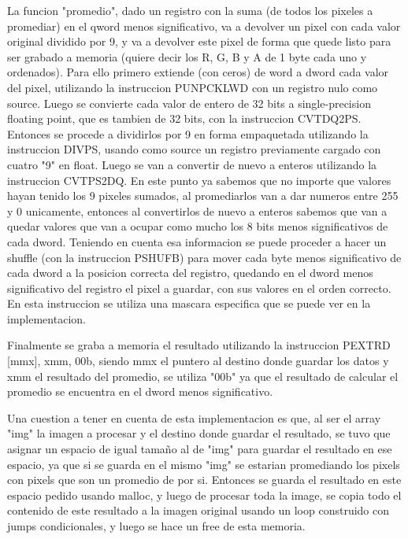 \documentclass[a4paper]{article}
\begin{document}
La funcion "promedio", dado un registro con la suma (de todos los pixeles a promediar) en el qword menos significativo, va a devolver un pixel con cada valor original dividido por 9, y va a devolver este pixel de forma que quede listo para ser grabado a memoria (quiere decir los R, G, B y A de 1 byte cada uno y ordenados). Para ello primero extiende (con ceros) de word a dword cada valor del pixel, utilizando la instruccion PUNPCKLWD con un registro nulo como source. Luego se convierte cada valor de entero de 32 bits a single-precision floating point, que es tambien de 32 bits, con la instruccion CVTDQ2PS. Entonces se procede a dividirlos por 9 en forma empaquetada utilizando la instruccion DIVPS, usando como source un registro previamente cargado con cuatro "9" en float. Luego se van a convertir de nuevo a enteros utilizando la instruccion CVTPS2DQ. En este punto ya sabemos que no importe que valores hayan tenido los 9 pixeles sumados, al promediarlos van a dar numeros entre 255 y 0 unicamente, entonces al convertirlos de nuevo a enteros sabemos que van a quedar valores que van a ocupar como mucho los 8 bits menos significativos de cada dword. Teniendo en cuenta esa informacion se puede proceder a hacer un shuffle (con la instruccion PSHUFB) para mover cada byte menos significativo de cada dword a la posicion correcta del registro, quedando en el dword menos significativo del registro el pixel a guardar, con sus valores en el orden correcto. En esta instruccion se utiliza una mascara especifica que se puede ver en la implementacion.
\newline

Finalmente se graba a memoria el resultado utilizando la instruccion PEXTRD [mmx], xmm, 00b, siendo mmx el puntero al destino donde guardar los datos y xmm el resultado del promedio, se utiliza "00b" ya que el resultado de calcular el promedio se encuentra en el dword menos significativo.
\newline

Una cuestion a tener en cuenta de esta implementacion es que, al ser el array "img" la imagen a procesar y el destino donde guardar el resultado, se tuvo que asignar un espacio de igual tamaño al de "img" para guardar el resultado en ese espacio, ya que si se guarda en el mismo "img" se estarian promediando los pixels con pixels que son un promedio de por si. Entonces se guarda el resultado en este espacio pedido usando malloc, y luego de procesar toda la image, se copia todo el contenido de este resultado a la imagen original usando un loop construido con jumps condicionales, y luego se hace un free de esta memoria.
\newline
\end{document}
